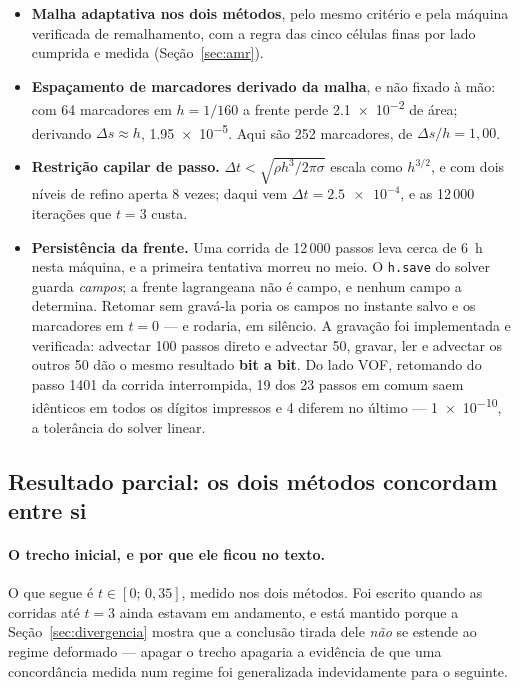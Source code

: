 \begin{itemize}
  \item \textbf{Malha adaptativa nos dois m\'etodos}, pelo mesmo crit\'erio e
    pela m\'aquina verificada de remalhamento, com a regra das cinco c\'elulas
    finas por lado cumprida e medida (Se\c{c}\~ao~\ref{sec:amr}).
  \item \textbf{Espa\c{c}amento de marcadores derivado da malha}, e n\~ao fixado
    \`a m\~ao: com 64 marcadores em $h=1/160$ a frente perde \num{2.1e-2} de
    \'area; derivando $\Delta s \approx h$, \num{1.95e-5}. Aqui s\~ao 252
    marcadores, de $\Delta s/h = 1{,}00$.
  \item \textbf{Restri\c{c}\~ao capilar de passo.} $\Delta t < \sqrt{\rho
    h^{3}/2\pi\sigma}$ escala como $h^{3/2}$, e com dois n\'iveis de refino
    aperta 8 vezes; daqui vem $\Delta t = \num{2.5e-4}$, e as 12\,000 itera\c{c}\~oes
    que $t=3$ custa.
  \item \textbf{Persist\^encia da frente.} Uma corrida de 12\,000 passos leva
    cerca de 6~h nesta m\'aquina, e a primeira tentativa morreu no meio. O
    \texttt{h.save} do solver guarda \emph{campos}; a frente lagrangeana n\~ao \'e
    campo, e nenhum campo a determina. Retomar sem grav\'a-la poria os campos no
    instante salvo e os marcadores em $t=0$ --- e rodaria, em sil\^encio. A
    grava\c{c}\~ao foi implementada e verificada: advectar 100 passos direto e
    advectar 50, gravar, ler e advectar os outros 50 d\~ao o mesmo resultado
    \textbf{bit a bit}. Do lado VOF, retomando do passo 1401 da corrida
    interrompida, 19 dos 23 passos em comum saem id\^enticos em todos os d\'igitos
    impressos e 4 diferem no \'ultimo --- \num{1e-10}, a toler\^ancia do solver
    linear.
\end{itemize}

\subsection{Resultado parcial: os dois m\'etodos concordam entre si}

\paragraph{O trecho inicial, e por que ele ficou no texto.} O que segue \'e
$t \in [0;\,0{,}35]$, medido nos dois m\'etodos. Foi escrito quando as corridas
at\'e $t=3$ ainda estavam em andamento, e est\'a mantido porque a
Se\c{c}\~ao~\ref{sec:divergencia} mostra que a conclus\~ao tirada dele
\emph{n\~ao} se estende ao regime deformado --- apagar o trecho apagaria a
evid\^encia de que uma concord\^ancia medida num regime foi generalizada
indevidamente para o seguinte.

